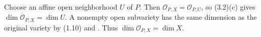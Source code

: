 Choose an affine open neighborhood $U$ of $P$. Then $\mathcal O_{P,X}=\mathcal O_{P,U}$, so (3.2)(c) gives $\dim\mathcal O_{P,X}=\dim U$. A nonempty open subvariety has the same dimension as the original variety by (1.10) and . Thus $\dim\mathcal O_{P,X}=\dim X$.
